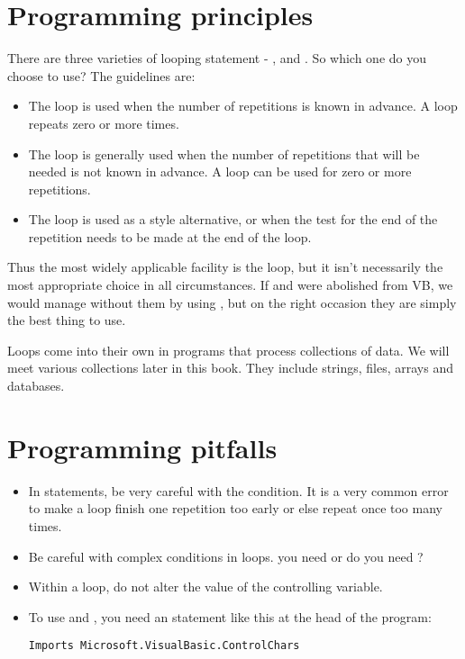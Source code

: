 	\section{Programming principles}
		There are three varieties of looping statement - ,  and . So which one do you choose to use? The guidelines are:
		\begin{itemize}
	    \item The  loop is used when the number of repetitions is known in advance. A  loop repeats zero or more times.
	    \item The  loop is generally used when the number of repetitions that will be needed is not known in advance. A  loop can be used for zero or more repetitions.
  	  \item The  loop is used as a style alternative, or when the test for the end of the repetition needs to be made at the end of the loop.
		\end{itemize}
		Thus the most widely applicable facility is the  loop, but it isn't necessarily the most appropriate choice in all circumstances. If  and  were abolished from VB, we would manage without them by using , but on the right occasion they are simply the best thing to use.
		
		Loops come into their own in programs that process collections of data. We will meet various collections later in this book. They include strings, files, arrays and databases.


	\section{Programming pitfalls}
		\begin{itemize}
  	  \item In  statements, be very careful with the condition. It is a very common error to make a loop finish one repetition too early or else repeat once too many times.
    	\item Be careful with complex conditions in  loops.  you need  or do you need ?
	    \item Within a  loop, do not alter the value of the controlling variable.
			\item To use  and , you need an  statement like this at the head of the program:
				\begin{lstlisting}
Imports Microsoft.VisualBasic.ControlChars
				\end{lstlisting}
		\end{itemize}


